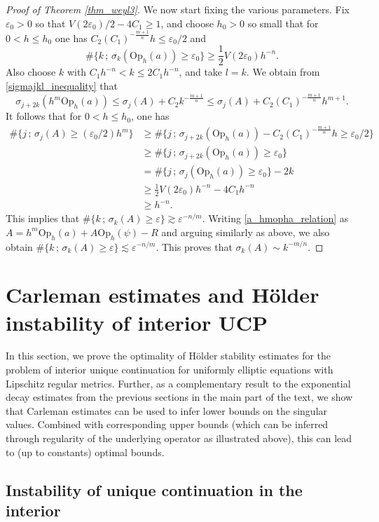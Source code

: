 \documentclass[12pt,twoside]{amsart}
\numberwithin{equation}{section}
\renewcommand{\leq}{\leqslant}
\renewcommand{\geq}{\geqslant}
\newcommand{\eps}{\varepsilon}
\begin{document}
\begin{appendix}
\begin{proof}[Proof of Theorem \ref{thm_weyl3}]
We now start fixing the various parameters. Fix $\eps_0 > 0$ so that $V(2 \eps_0)/2 - 4 C_1 \geq 1$, and choose $h_0 > 0$ so small that for $0 < h \leq h_0$ one has $C_2 (C_1)^{-\frac{m+1}{n}} h \leq \eps_0/2$ and 
\[
\# \{ k \,;\, \sigma_k(\mathrm{Op}_h(a)) \geq \eps_0 \} \geq \frac{1}{2} V(2 \eps_0) h^{-n}.
\]
Also choose $k$ with $C_1 h^{-n} < k \leq 2 C_1 h^{-n}$, and take $l = k$. We obtain from \eqref{sigmajkl_inequality} that 
\[
\sigma_{j+2k}(h^m \mathrm{Op}_h(a)) \leq \sigma_j(A) + C_2 k^{-\frac{m+1}{n}} \leq \sigma_j(A) + C_2 (C_1)^{-\frac{m+1}{n}} h^{m+1}.
\]
It follows that for $0 < h \leq h_0$, one has 
\begin{align*}
\# \{ j \,;\, \sigma_j(A) \geq (\eps_0/2) h^m \} &\geq \# \{ j \,;\, \sigma_{j+2k}(\mathrm{Op}_h(a)) - C_2 (C_1)^{-\frac{m+1}{n}} h \geq \eps_0/2 \} \\
 &\geq \# \{ j \,;\, \sigma_{j+2k}(\mathrm{Op}_h(a)) \geq \eps_0 \} \\
 &= \# \{ j \,;\, \sigma_j(\mathrm{Op}_h(a)) \geq \eps_0 \} -2k \\
 &\geq \frac{1}{2} V(2 \eps_0) h^{-n} - 4 C_1 h^{-n} \\
 &\geq h^{-n}.
\end{align*}
This implies that $\# \{ k \,;\, \sigma_k(A) \geq \eps \} \gtrsim \eps^{-n/m}$. Writing \eqref{a_hmopha_relation} as $A = h^m \mathrm{Op}_h(a) + A \mathrm{Op}_h(\psi) - R$ and arguing similarly as above, we also obtain $\# \{ k \,;\, \sigma_k(A) \geq \eps \} \lesssim \eps^{-n/m}$. This proves that $\sigma_k(A) \sim k^{-m/n}$.
\end{proof}


\section{Carleman estimates and H{\"o}lder instability of interior UCP}
\label{sec:Carl}

In this section, we prove the optimality of H{\"o}lder stability estimates for the problem of interior unique continuation for uniformly elliptic equations with Lipschitz regular metrics.
Further, as a complementary result to the exponential decay estimates from the previous sections in the main part of the text, we show that Carleman estimates can be used to infer lower bounds on the singular values. Combined with corresponding upper bounds (which can be inferred through regularity of the underlying operator as illustrated above), this can lead to (up to constants) optimal bounds.

\subsection{Instability of unique continuation in the interior}
\label{sec:UCP_int}


\end{appendix}
\end{document}
